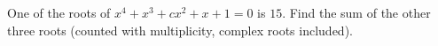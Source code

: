 One of the roots of $x^4+x^3+cx^2+x+1=0$ is $15$. Find the sum of the other three roots (counted with multiplicity, complex roots included).
